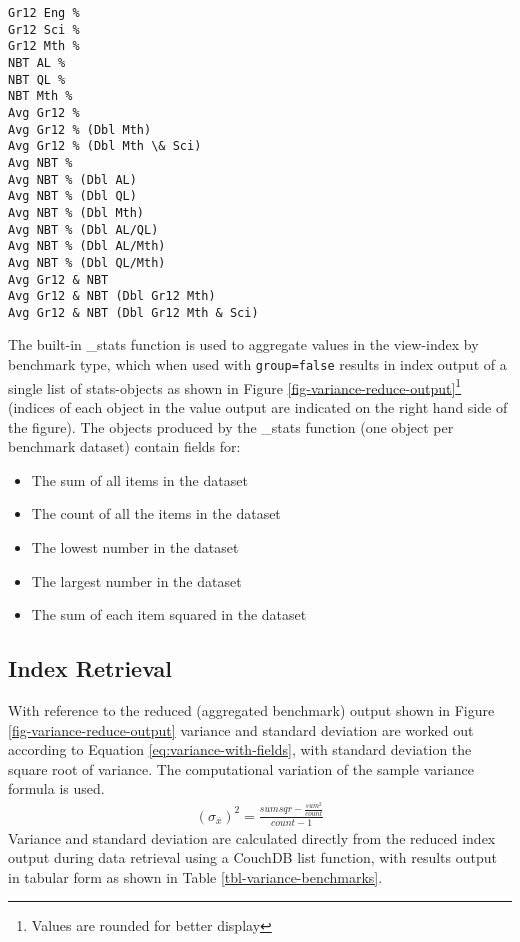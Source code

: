 \begin{verbatim}
Gr12 Eng % 
Gr12 Sci % 
Gr12 Mth % 
NBT AL % 
NBT QL % 
NBT Mth % 
Avg Gr12 % 
Avg Gr12 % (Dbl Mth)
Avg Gr12 % (Dbl Mth \& Sci)
Avg NBT % 
Avg NBT % (Dbl AL)
Avg NBT % (Dbl QL)
Avg NBT % (Dbl Mth)
Avg NBT % (Dbl AL/QL)
Avg NBT % (Dbl AL/Mth)
Avg NBT % (Dbl QL/Mth)
Avg Gr12 & NBT 
Avg Gr12 & NBT (Dbl Gr12 Mth)
Avg Gr12 & NBT (Dbl Gr12 Mth & Sci)
\end{verbatim}

The built-in \_stats function is used to aggregate values in the view-index by benchmark type, which when used with \texttt{group=false} results in index output of a single list of stats-objects as shown in Figure \ref{fig-variance-reduce-output}\footnote{Values are rounded for better display} (indices of each object in the value output are indicated on the right hand side of the figure). The objects produced by the \_stats function (one object per benchmark dataset) contain fields for:

\begin{itemize}
  \item The sum of all items in the dataset
  \item The count of all the items in the dataset
  \item The lowest number in the dataset
  \item The largest number in the dataset
  \item The sum of each item squared in the dataset
\end{itemize}



\subsection{Index Retrieval}
With reference to the reduced (aggregated benchmark) output shown in Figure \ref{fig-variance-reduce-output} variance and standard deviation are worked out according to Equation \ref{eq:variance-with-fields}, with standard deviation the square root of variance. The computational variation of the sample variance formula is used.
\begin{align}
  (\sigma_{\overline{x}})^{2} =  \frac{sumsqr - \frac{sum^2}{count}}{count - 1}\label{eq:variance-with-fields}
\end{align}
Variance and standard deviation are calculated directly from the reduced index output during data retrieval using a CouchDB list function, with results output in tabular form as shown in Table \ref{tbl-variance-benchmarks}.

